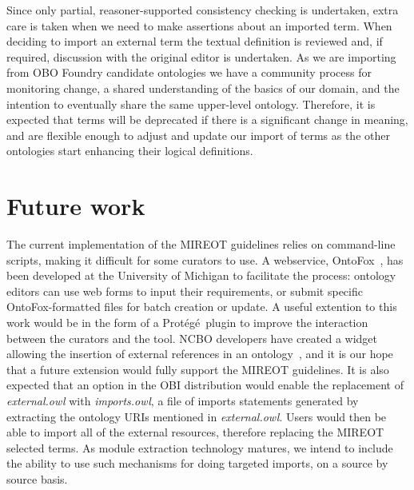 \documentclass[jou]{ao2e}%
\newcommand{\protege}{Prot\'{e}g\'{e}}
\begin{document}
Since only partial, reasoner-supported consistency checking is undertaken, extra care is taken when we need to make assertions about an imported term. %
When deciding to import an external term the textual definition is reviewed and, if required, discussion with the original editor is undertaken.
As we are importing from \ac{OBO} Foundry candidate ontologies we have a community process for monitoring change, a shared understanding of the basics of our domain, and the intention to eventually share the same upper-level ontology. 
Therefore, it is expected that terms will be deprecated if there is a significant change in meaning, and are flexible enough to adjust and update our import of terms as the other ontologies start enhancing their logical definitions.

\section*{Future work}
The current implementation of the \ac{MIREOT} guidelines relies on command-line scripts, making it difficult for some curators to use. 
A webservice, OntoFox~\citep{OntoFox}, has been developed at the University of Michigan to facilitate the process: ontology editors can use web forms to input their requirements, or submit specific OntoFox-formatted files for batch creation or update.
A useful extention to this work would be in the form of a \protege\  plugin to improve the interaction between the curators and the tool. NCBO developers have created a widget allowing the insertion of external references in an ontology~\citep{NCBOWidget}, and it is our hope that a future extension would fully support the MIREOT guidelines.
It is also expected that an option in the \ac{OBI} distribution would enable the replacement of \emph{external.owl} with \emph{imports.owl}, a file of imports statements generated by extracting the ontology URIs mentioned in \emph{external.owl}. Users would then be able to import all of the external resources, therefore replacing the MIREOT selected terms.  As module extraction technology matures, we intend to include the ability to use such mechanisms for doing targeted imports, on a source by source basis.%
\end{document}
